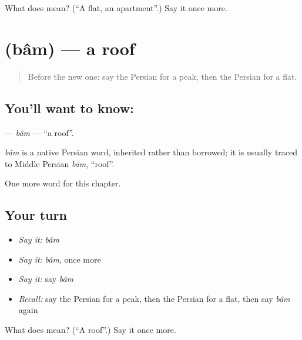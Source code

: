 \begin{tcolorbox}[breakable,colback=teal!4,colframe=teal!35!black,title={Before you move on}]
What does  mean? (\textquotedblleft{}A flat, an apartment\textquotedblright{}.) Say it once more.
\end{tcolorbox}
\section[\texorpdfstring{\fa{بام} (bâm)}{بام (bâm)}]{ (bâm) — a roof}

\label{lesson:FA-C195-bam}



\begin{quote}
Before the new one: say the Persian for a peak, then the Persian for a flat.
\end{quote}

\subsection*{You'll want to know: }
\textbf{} — \emph{bâm} — \textquotedblleft{}a roof\textquotedblright{}.

\begin{cousinweb}
\emph{bâm} is a native Persian word, inherited rather than borrowed; it is usually traced to Middle Persian \emph{bām}, \textquotedblleft{}roof\textquotedblright{}.
\end{cousinweb}

\begin{grammarlens}[title={What you've built}]
One more word for this chapter.
\end{grammarlens}

\subsection*{Your turn}
\begin{itemize}
\raggedright
  \item \emph{Say it:} \emph{bâm}
  \item \emph{Say it:} \emph{bâm}, once more
  \item \emph{Say it:} say \emph{bâm}
  \item \emph{Recall:} say the Persian for a peak, then the Persian for a flat, then say \emph{bâm} again
\end{itemize}

\begin{tcolorbox}[breakable,colback=teal!4,colframe=teal!35!black,title={Before you move on}]
What does  mean? (\textquotedblleft{}A roof\textquotedblright{}.) Say it once more.
\end{tcolorbox}
